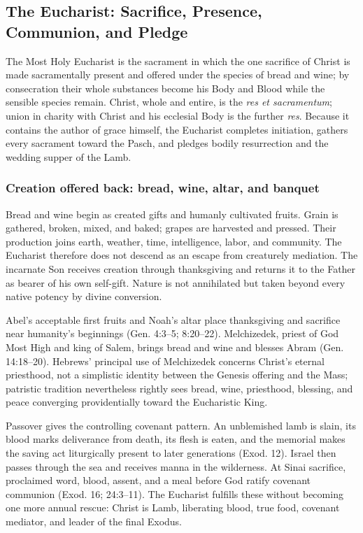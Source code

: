 \subsection{The Eucharist: Sacrifice, Presence, Communion, and Pledge}

The Most Holy Eucharist is the sacrament in which the one sacrifice of Christ is made sacramentally present and offered under the species of bread and wine; by consecration their whole substances become his Body and Blood while the sensible species remain. Christ, whole and entire, is the \emph{res et sacramentum}; union in charity with Christ and his ecclesial Body is the further \emph{res}. Because it contains the author of grace himself, the Eucharist completes initiation, gathers every sacrament toward the Pasch, and pledges bodily resurrection and the wedding supper of the Lamb.

\subsubsection{Creation offered back: bread, wine, altar, and banquet}

Bread and wine begin as created gifts and humanly cultivated fruits. Grain is gathered, broken, mixed, and baked; grapes are harvested and pressed. Their production joins earth, weather, time, intelligence, labor, and community. The Eucharist therefore does not descend as an escape from creaturely mediation. The incarnate Son receives creation through thanksgiving and returns it to the Father as bearer of his own self-gift. Nature is not annihilated but taken beyond every native potency by divine conversion.

\enlargethispage{\baselineskip}
Abel's acceptable first fruits and Noah's altar place thanksgiving and sacrifice near humanity's beginnings (Gen. 4:3--5; 8:20--22). Melchizedek, priest of God Most High and king of Salem, brings bread and wine and blesses Abram (Gen. 14:18--20). Hebrews' principal use of Melchizedek concerns Christ's eternal priesthood, not a simplistic identity between the Genesis offering and the Mass; patristic tradition nevertheless rightly sees bread, wine, priesthood, blessing, and peace converging providentially toward the Eucharistic King.

Passover gives the controlling covenant pattern. An unblemished lamb is slain, its blood marks deliverance from death, its flesh is eaten, and the memorial makes the saving act liturgically present to later generations (Exod. 12). Israel then passes through the sea and receives manna in the wilderness. At Sinai sacrifice, proclaimed word, blood, assent, and a meal before God ratify covenant communion (Exod. 16; 24:3--11). The Eucharist fulfills these without becoming one more annual rescue: Christ is Lamb, liberating blood, true food, covenant mediator, and leader of the final Exodus.

